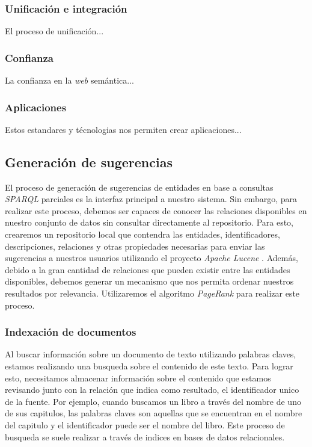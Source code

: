\subsubsection{Unificación e integración}

El proceso de unificación...

\subsubsection{Confianza}

La confianza en la \textit{web} semántica...

\subsubsection{Aplicaciones}

Estos estandares y técnologias nos permiten crear aplicaciones...

\subsection{Generación de sugerencias}

El proceso de generación de sugerencias de entidades en base a consultas
\textit{SPARQL} parciales es la interfaz principal a nuestro sistema. Sin
embargo, para realizar este proceso, debemos ser capaces de conocer las
relaciones disponibles en nuestro conjunto de datos sin consultar directamente
al repositorio. Para esto, crearemos un repositorio local que contendra las
entidades, identificadores, descripciones, relaciones y otras propiedades
necesarias para enviar las sugerencias a nuestros usuarios utilizando el
proyecto \textit{Apache Lucene} \cite{apache2012welcome}. Además, debido a la
gran cantidad de relaciones que pueden existir entre las entidades disponibles,
debemos generar un mecanismo que nos permita ordenar nuestros resultados por
relevancia. Utilizaremos el algoritmo \textit{PageRank} \cite{page1999pagerank}
para realizar este proceso.

\subsubsection{Indexación de documentos}
\label{sec:index-types}

Al buscar información sobre un documento de texto utilizando palabras claves,
estamos realizando una busqueda sobre el contenido de este texto. Para lograr
esto, necesitamos almacenar información sobre el contenido que estamos revisando
junto con la relación que indica como resultado, el identificador unico de la
fuente. Por ejemplo, cuando buscamos un libro a través del nombre de uno de sus
capitulos, las palabras claves son aquellas que se encuentran en el nombre del
capitulo y el identificador puede ser el nombre del libro. Este proceso de
busqueda se suele realizar a través de indices en bases de datos relacionales.

